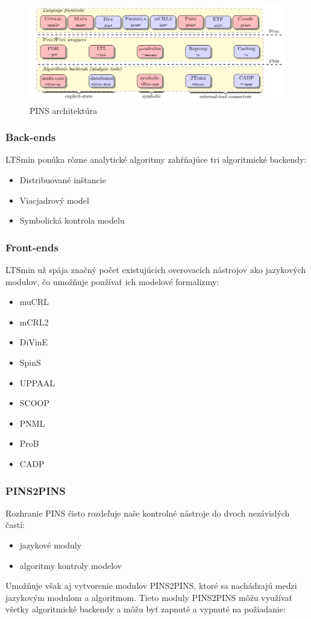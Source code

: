\begin{figure}[ht]
\centerline{\includegraphics[width=1\textwidth]{images/ltsmin}}
\caption[PINS architektúra]{PINS architektúra}
\label{obr:pins}
\end{figure}

\subsubsection{Back-ends}
LTSmin ponúka rôzne analytické algoritmy zahŕňajúce tri algoritmické backendy:

\begin{itemize}
	\item Distribuované inštancie
	\item Viacjadrový model
	\item Symbolická kontrola modelu
\end{itemize}

\subsubsection{Front-ends}
LTSmin už spája značný počet existujúcich overovacích nástrojov ako jazykových modulov, 
čo umožňuje používať ich modelové formalizmy:

\begin{itemize}
	\item muCRL
	\item mCRL2
	\item DiVinE
	\item SpinS
	\item UPPAAL
	\item SCOOP
	\item PNML
	\item ProB
	\item CADP
\end{itemize}

\subsubsection{PINS2PINS}
Rozhranie PINS čisto rozdeľuje naše kontrolné nástroje do dvoch nezávislých častí: 
\begin{itemize}
	\item jazykové moduly
	\item algoritmy kontroly modelov
\end{itemize}
Umožňuje však aj vytvorenie modulov PINS2PINS, 
ktoré sa nachádzajú medzi jazykovým modulom a algoritmom.
Tieto moduly PINS2PINS môžu využívať všetky algoritmické backendy a 
môžu byť zapnuté a vypnuté na požiadanie:

